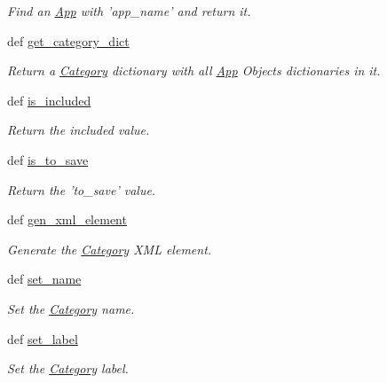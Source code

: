 \begin{CompactItemize}
\begin{CompactList}\small\item\em Find an \hyperlink{classwinsollib_1_1App}{App} with 'app\_\-name' and return it. \item\end{CompactList}\item 
def \hyperlink{classwinsollib_1_1Category_7a5e18b9050c6cc633496042e7d2e10a}{get\_\-category\_\-dict}
\begin{CompactList}\small\item\em Return a \hyperlink{classwinsollib_1_1Category}{Category} dictionary with all \hyperlink{classwinsollib_1_1App}{App} Objects dictionaries in it. \item\end{CompactList}\item 
def \hyperlink{classwinsollib_1_1Category_c3de054ef3bfb2c97abe4b6ddebc3e63}{is\_\-included}
\begin{CompactList}\small\item\em Return the {\em included\/} value. \item\end{CompactList}\item 
def \hyperlink{classwinsollib_1_1Category_a144aa5fc30058626bc9da60117098d1}{is\_\-to\_\-save}
\begin{CompactList}\small\item\em Return the 'to\_\-save' value. \item\end{CompactList}\item 
def \hyperlink{classwinsollib_1_1Category_e69f0248b9a714ee7ada3b1fd7d3c40f}{gen\_\-xml\_\-element}
\begin{CompactList}\small\item\em Generate the \hyperlink{classwinsollib_1_1Category}{Category} XML element. \item\end{CompactList}\item 
def \hyperlink{classwinsollib_1_1Category_c5946ade32f0125e54082e062bc48d4c}{set\_\-name}
\begin{CompactList}\small\item\em Set the \hyperlink{classwinsollib_1_1Category}{Category} name. \item\end{CompactList}\item 
def \hyperlink{classwinsollib_1_1Category_ab90d2aa598aa694daf1d46651e52e97}{set\_\-label}
\begin{CompactList}\small\item\em Set the \hyperlink{classwinsollib_1_1Category}{Category} label. \item\end{CompactList}\item 

\end{CompactItemize}
